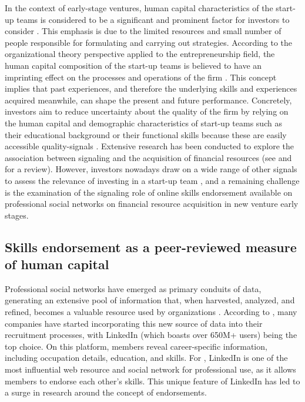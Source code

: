 \documentclass[12pt]{article}
\begin{document}
In the context of early-stage ventures, human capital characteristics of the start-up teams is considered to be a significant and prominent factor for investors to consider \citep{beckman2007early, ko2018signaling, matusik2008values}. This emphasis is due to the limited resources and small number of people responsible for formulating and carrying out strategies. According to the organizational theory perspective applied to the entrepreneurship field, the human capital composition of the start-up teams is believed to have an imprinting effect on the processes and operations of the firm \citep{packalen2007complementing}. This concept implies that past experiences, and therefore the underlying skills and experiences acquired meanwhile, can shape the present and future performance. Concretely, investors aim to reduce uncertainty about the quality of the firm by relying on the human capital and demographic characteristics of start-up teams such as their educational background or their functional skills because these are easily accessible quality-signals \citep{colombo2005founders, beckman2007early, eddleston2016you, plummer2016better}. Extensive research has been conducted to explore the association between signaling and the acquisition of financial resources (see \citet{connelly2011signaling} and \citet{colombo2021use} for a review). However, investors nowadays draw on a wide range of other signals to assess the relevance of investing in a start-up team \citep{banerji2019startup, mollick2014dynamics, courtney2017resolving}, and a remaining challenge is the examination of the signaling role of online skills endorsement available on professional social networks \citep{drakopoulos2020building, perez2016endorsement, rapanta2017linkedin, yan2019social} on financial resource acquisition in new venture early stages.

\subsection{Skills endorsement as a peer-reviewed measure of human capital}

Professional social networks have emerged as primary conduits of data, generating an extensive pool of information that, when harvested, analyzed, and refined, becomes a valuable resource used by organizations \citep{ponte2022use}. According to \citep{urdaneta2021lifelong}, many companies have started incorporating this new source of data into their recruitment processes, with LinkedIn (which boasts over 650M+ users) being the top choice. On this platform, members reveal career-specific information, including occupation details, education, and skills. For \citep{rapanta2017linkedin}, LinkedIn is one of the most influential web resource and social network for professional use, as it allows members to endorse each other's skills. This unique feature of LinkedIn has led to a surge in research around the concept of endorsements.
\end{document}
